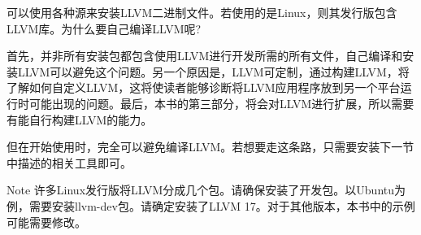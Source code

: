 可以使用各种源来安装LLVM二进制文件。若使用的是Linux，则其发行版包含LLVM库。为什么要自己编译LLVM呢?

首先，并非所有安装包都包含使用LLVM进行开发所需的所有文件，自己编译和安装LLVM可以避免这个问题。另一个原因是，LLVM可定制，通过构建LLVM，将了解如何自定义LLVM，这将使读者能够诊断将LLVM应用程序放到另一个平台运行时可能出现的问题。最后，本书的第三部分，将会对LLVM进行扩展，所以需要有能自行构建LLVM的能力。

但在开始使用时，完全可以避免编译LLVM。若想要走这条路，只需要安装下一节中描述的相关工具即可。

\begin{myNotic}{Note}
许多Linux发行版将LLVM分成几个包。请确保安装了开发包。以Ubuntu为例，需要安装llvm-dev包。请确定安装了LLVM 17。对于其他版本，本书中的示例可能需要修改。
\end{myNotic}